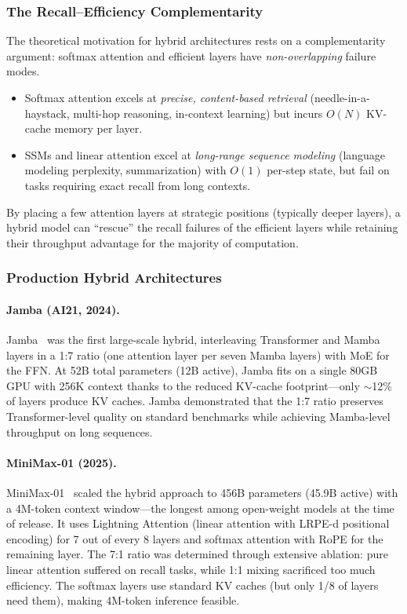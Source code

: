 \documentclass[11pt,a4paper]{article}
\begin{document}
\subsubsection{The Recall--Efficiency Complementarity}

The theoretical motivation for hybrid architectures rests on a complementarity argument: softmax attention and efficient layers have \emph{non-overlapping} failure modes.
\begin{itemize}[nosep]
\item Softmax attention excels at \emph{precise, content-based retrieval} (needle-in-a-haystack, multi-hop reasoning, in-context learning) but incurs $O(N)$ KV-cache memory per layer.
\item SSMs and linear attention excel at \emph{long-range sequence modeling} (language modeling perplexity, summarization) with $O(1)$ per-step state, but fail on tasks requiring exact recall from long contexts.
\end{itemize}
By placing a few attention layers at strategic positions (typically deeper layers), a hybrid model can ``rescue'' the recall failures of the efficient layers while retaining their throughput advantage for the majority of computation.

\subsubsection{Production Hybrid Architectures}

\paragraph{Jamba (AI21, 2024).}
Jamba~\cite{lieber2024jamba_tr} was the first large-scale hybrid, interleaving Transformer and Mamba layers in a 1:7 ratio (one attention layer per seven Mamba layers) with MoE for the FFN. At 52B total parameters (12B active), Jamba fits on a single 80GB GPU with 256K context thanks to the reduced KV-cache footprint---only $\sim$12\% of layers produce KV caches. Jamba demonstrated that the 1:7 ratio preserves Transformer-level quality on standard benchmarks while achieving Mamba-level throughput on long sequences.

\paragraph{MiniMax-01 (2025).}
MiniMax-01~\cite{minimax2025} scaled the hybrid approach to 456B parameters (45.9B active) with a 4M-token context window---the longest among open-weight models at the time of release. It uses Lightning Attention (linear attention with LRPE-d positional encoding) for 7 out of every 8 layers and softmax attention with RoPE for the remaining layer. The 7:1 ratio was determined through extensive ablation: pure linear attention suffered on recall tasks, while 1:1 mixing sacrificed too much efficiency. The softmax layers use standard KV caches (but only 1/8 of layers need them), making 4M-token inference feasible.
\end{document}
